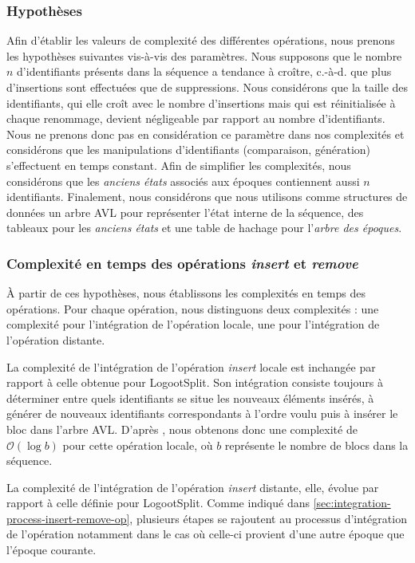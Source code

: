 \documentclass[12pt]{thesul}
\newcommand{\ie}{c.-à-d. }
\newcommand\bigO[1]{$\mathcal{O}(#1)$}
\begin{document}
\subsubsection{Hypothèses}

Afin d'établir les valeurs de complexité des différentes opérations, nous prenons les hypothèses suivantes vis-à-vis des paramètres.
Nous supposons que le nombre $n$ d'identifiants présents dans la séquence a tendance à croître, \ie que plus d'insertions sont effectuées que de suppressions.
Nous considérons que la taille des identifiants, qui elle croît avec le nombre d'insertions mais qui est réinitialisée à chaque renommage, devient négligeable par rapport au nombre d'identifiants.
Nous ne prenons donc pas en considération ce paramètre dans nos complexités et considérons que les manipulations d'identifiants (comparaison, génération) s'effectuent en temps constant.
Afin de simplifier les complexités, nous considérons que les \emph{anciens états} associés aux époques contiennent aussi $n$ identifiants.
Finalement, nous considérons que nous utilisons comme structures de données un arbre AVL pour représenter l'état interne de la séquence, des tableaux pour les \emph{anciens états} et une table de hachage pour l'\emph{arbre des époques}.

\subsubsection{Complexité en temps des opérations \emph{insert} et \emph{remove}}

À partir de ces hypothèses, nous établissons les complexités en temps des opérations.
Pour chaque opération, nous distinguons deux complexités : une complexité pour l'intégration de l'opération locale, une pour l'intégration de l'opération distante.

La complexité de l'intégration de l'opération \emph{insert} locale est inchangée par rapport à celle obtenue pour LogootSplit.
Son intégration consiste toujours à déterminer entre quels identifiants se situe les nouveaux éléments insérés, à générer de nouveaux identifiants correspondants à l'ordre voulu puis à insérer le bloc dans l'arbre AVL.
D'après \textcite{2013-logootsplit}, nous obtenons donc une complexité de \bigO{\log{}b} pour cette opération locale, où $b$ représente le nombre de blocs dans la séquence.

La complexité de l'intégration de l'opération \emph{insert} distante, elle, évolue par rapport à celle définie pour LogootSplit.
Comme indiqué dans \autoref{sec:integration-process-insert-remove-op}, plusieurs étapes se rajoutent au processus d'intégration de l'opération notamment dans le cas où celle-ci provient d'une autre époque que l'époque courante.
\end{document}
